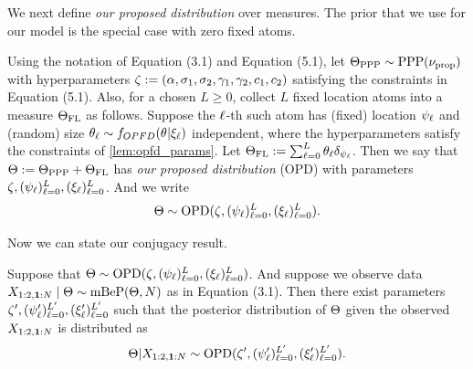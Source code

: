 We next define \emph{our proposed distribution} over measures. The prior that we use for our model is the special case with zero fixed atoms. 

\begin{myDefinition}
    Using the notation of Equation (3.1) and Equation (5.1), let
    $\Theta_{\mathrm{PPP}} \sim \mathrm{PPP}(\nu_{\mathrm{prop}})$ with hyperparameters $\allhyper := (\mass, \rate{1}, \rate{2}, \corr{1}, \corr{2}, \conc{1}, \conc{2})$
    satisfying the constraints in Equation (5.1).
    Also, for a chosen $L \ge 0$, collect $L$ fixed location atoms into a measure $\Theta_{\mathrm{FL}}$ as follows. Suppose the $\ell$-th such atom has (fixed) location $\psi_{\ell}$ and (random) size $\genericvecvariantfreq \sim f_{OPFD}(\vecvariantfreq{} | \allopfdhyper_{\variantidx})$ independent, where the hyperparameters satisfy the constraints of \cref{lem:opfd_params}.
    Let
    $\randommeas_{\mathrm{FL}} := \sum_{\variantidx = 0}^{L} \genericvecvariantfreq \dirac{\genericvariantlabel}$.
    Then we say that $\Theta := \Theta_{\mathrm{PPP}} + \Theta_{\mathrm{FL}}$ has \emph{our proposed distribution} (OPD) with parameters
    $\allhyper, (\genericvariantlabel)_{\variantidx=0}^{L}, (\allopfdhyper_{\variantidx})_{\variantidx=0}^{L}$. And we write
    \begin{equation}
        \randommeas \sim \mathrm{OPD}(\allhyper, (\genericvariantlabel)_{\variantidx=0}^{L}, (\allopfdhyper_{\variantidx})_{\variantidx=0}^{L}).
    \end{equation}
\end{myDefinition}


Now we can state our conjugacy result.
\begin{myLemma}
Suppose that $\randommeas \sim \mathrm{OPD}(\allhyper, (\genericvariantlabel)_{\variantidx=0}^{L}, (\allopfdhyper_{\variantidx})_{\variantidx=0}^{L})$.
And suppose we observe data $\pilotdata \mid \randommeas \sim \mBeP(\randommeas, \vecsamplesize)$ as in Equation (3.1).
Then there exist parameters $\allhyper', (\genericvariantlabel')_{\variantidx=0}^{L'}, (\allopfdhyper'_{\variantidx})_{\variantidx=0}^{L'}$ such that the posterior distribution of $\Theta$ given the observed $\pilotdata$ is distributed as 
\begin{equation} 
	\randommeas | \pilotdata \sim \mathrm{OPD}(\allhyper', (\genericvariantlabel')_{\variantidx=0}^{L'}, (\allopfdhyper'_{\variantidx})_{\variantidx=0}^{L'}).
\end{equation}
\end{myLemma}

